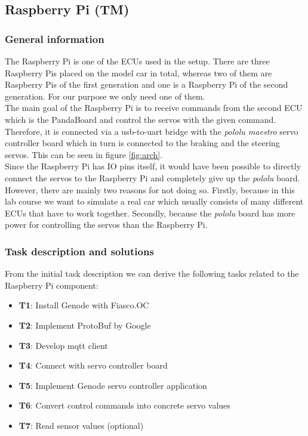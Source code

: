 \subsection{Raspberry Pi (TM)}
\label{sec:rpi}

\subsubsection{General information}
The Raspberry Pi is one of the ECUs used in the setup. There are three Raspberry Pis placed on the model car in total, whereas two of them are Raspberry Pis of the first generation and one is a Raspberry Pi of the second generation. For our purpose we only need one of them. \\

The main goal of the Raspberry Pi is to receive commands from the second ECU which is the PandaBoard and control the servos with the given command. Therefore, it is connected via a usb-to-uart bridge with the \textit{pololu maestro} servo controller board which in turn is connected to the braking and the steering servos. This can be seen in figure \ref{fig:arch}. \\

Since the Raspberry Pi has IO pins itself, it would have been possible to directly connect the servos to the Raspberry Pi and completely give up the \textit{pololu} board. However, there are mainly two reasons for not doing so. Firstly, because in this lab course we want to simulate a real car which usually consists of many different ECUs that have to work together. Secondly, because the \textit{pololu} board has more power for controlling the servos than the Raspberry Pi. 


\subsubsection{Task description and solutions}
\label{sec:rpi-req}
From the initial task description we can derive the following tasks related to the Raspberry Pi component:

\begin{itemize}
    \item \textbf{T1}: Install Genode with Fiasco.OC
    \item \textbf{T2}: Implement ProtoBuf by Google
    \item \textbf{T3}: Develop mqtt client
    \item \textbf{T4}: Connect with servo controller board
    \item \textbf{T5}: Implement Genode servo controller application
    \item \textbf{T6}: Convert control commands into concrete servo values
    \item \textbf{T7}: Read sensor values (optional)
\end{itemize}

